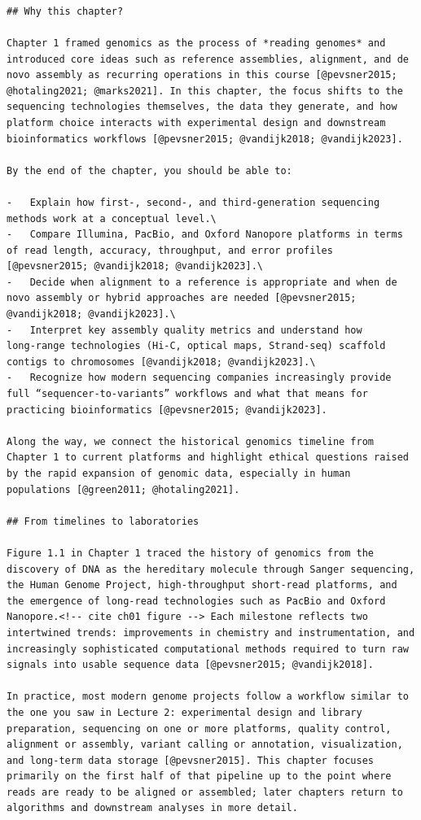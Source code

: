 \documentclass[
  letterpaper,
  DIV=11,
  numbers=noendperiod]{scrreprt}
\begin{document}
\begin{verbatim}



## Why this chapter?

Chapter 1 framed genomics as the process of *reading genomes* and introduced core ideas such as reference assemblies, alignment, and de novo assembly as recurring operations in this course [@pevsner2015; @hotaling2021; @marks2021]. In this chapter, the focus shifts to the sequencing technologies themselves, the data they generate, and how platform choice interacts with experimental design and downstream bioinformatics workflows [@pevsner2015; @vandijk2018; @vandijk2023].

By the end of the chapter, you should be able to:

-   Explain how first‑, second‑, and third‑generation sequencing methods work at a conceptual level.\
-   Compare Illumina, PacBio, and Oxford Nanopore platforms in terms of read length, accuracy, throughput, and error profiles [@pevsner2015; @vandijk2018; @vandijk2023].\
-   Decide when alignment to a reference is appropriate and when de novo assembly or hybrid approaches are needed [@pevsner2015; @vandijk2018; @vandijk2023].\
-   Interpret key assembly quality metrics and understand how long‑range technologies (Hi‑C, optical maps, Strand‑seq) scaffold contigs to chromosomes [@vandijk2018; @vandijk2023].\
-   Recognize how modern sequencing companies increasingly provide full “sequencer‑to‑variants” workflows and what that means for practicing bioinformatics [@pevsner2015; @vandijk2023].

Along the way, we connect the historical genomics timeline from Chapter 1 to current platforms and highlight ethical questions raised by the rapid expansion of genomic data, especially in human populations [@green2011; @hotaling2021].

## From timelines to laboratories

Figure 1.1 in Chapter 1 traced the history of genomics from the discovery of DNA as the hereditary molecule through Sanger sequencing, the Human Genome Project, high‑throughput short‑read platforms, and the emergence of long‑read technologies such as PacBio and Oxford Nanopore.<!-- cite ch01 figure --> Each milestone reflects two intertwined trends: improvements in chemistry and instrumentation, and increasingly sophisticated computational methods required to turn raw signals into usable sequence data [@pevsner2015; @vandijk2018].

In practice, most modern genome projects follow a workflow similar to the one you saw in Lecture 2: experimental design and library preparation, sequencing on one or more platforms, quality control, alignment or assembly, variant calling or annotation, visualization, and long‑term data storage [@pevsner2015]. This chapter focuses primarily on the first half of that pipeline up to the point where reads are ready to be aligned or assembled; later chapters return to algorithms and downstream analyses in more detail.


\end{verbatim}
\end{document}

